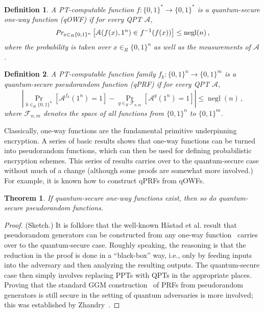 \documentclass[11pt]{article}
\numberwithin{equation}{section}
\newtheorem{theorem}{Theorem}
\newtheorem{definition}{Definition}
\newcommand{\opn}{\operatorname}
\newcommand{\algo}{\mathcal}
\newcommand{\negl}{\opn{negl}}
\newcommand{\inrand}{\in_R}
\newcommand{\prob}{\opn{Pr}}
\begin{document}
{\begin{definition}\label{def:quantum-secure-owf}
A PT-computable function $f:\{0,1\}^* \rightarrow \{0, 1\}^*$ is a quantum-secure one-way function (qOWF) if for every QPT $\algo A$, 
$$
\emph{Pr}_{x \inrand \{0, 1\}^n} \left[\algo A (f(x), 1^n) \in f^{-1}(f(x)) \right] \leq \negl(n)\,,
$$
where the probability is taken over $x \inrand \{0, 1\}^n$ as well as the measurements of $\algo A$.
\end{definition}

\begin{definition}\label{def:quantum-secure-prf}
A PT-computable function family $f_k : \{0,1\}^n \rightarrow \{0, 1\}^m$ is a quantum-secure pseudorandom function (qPRF) if for every QPT $\algo A$, 
$$
\left|\prob_{k \inrand \{0, 1\}^n} [\algo A^{f_k}(1^n) = 1] - \prob_{g \inrand \mathcal F_{n, m}}[ \algo A^g(1^n) = 1]\right|
\leq \negl(n)\,,
$$
where $\mathcal F_{n, m}$ denotes the space of all functions from $\{0,1\}^n$ to $\{0,1\}^m$.
\end{definition}

Classically, one-way functions are the fundamental primitive underpinning encryption. A series of basic results shows that one-way functions can be turned into pseudorandom functions, which can then be used for defining probabilistic encryption schemes. This series of results carries over to the quantum-secure case without much of a change (although some proofs are somewhat more involved.) For example, it is known how to construct qPRFs from qOWFs.

\begin{theorem}\label{thm:qOWF-implies-qPRF}
If quantum-secure one-way functions exist, then so do quantum-secure pseudorandom functions.
\end{theorem}
\begin{proof} (Sketch.) It is folklore that the well-known H{\aa}stad et al. result that pseudorandom generators can be constructed from any one-way function~\cite{HILL99} carries over to the quantum-secure case. Roughly speaking, the reasoning is that the reduction in the proof is done in a ``black-box'' way, i.e., only by feeding inputs into the adversary and then analyzing the resulting outputs. The quantum-secure case then simply involves replacing PPTs with QPTs in the appropriate places. Proving that the standard GGM construction~\cite{GGM86} of PRFs from pseudorandom generators is still secure in the setting of quantum adversaries is more involved; this was established by Zhandry~\cite{Zhandry2012}.
\end{proof}

}
\end{document}
